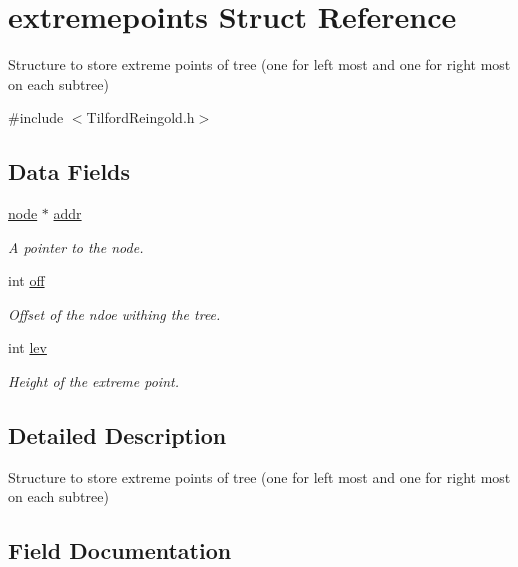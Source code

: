 \hypertarget{structextremepoints}{}\section{extremepoints Struct Reference}
\label{structextremepoints}


Structure to store extreme points of tree (one for left most and one for right most on each subtree)  




{\ttfamily \#include $<$Tilford\+Reingold.\+h$>$}

\subsection*{Data Fields}
\begin{DoxyCompactItemize}
\item 
\hyperlink{binary_tree_w_s_8h_aafd781b4673cf2585cd9a156aebd08de}{node} $\ast$ \hyperlink{structextremepoints_aa6f61de0a8af1deca2a3b63278249175}{addr}
\begin{DoxyCompactList}\small\item\em A pointer to the node. \end{DoxyCompactList}\item 
int \hyperlink{structextremepoints_a9e515b0315e6fc452a46dc6496979ee3}{off}
\begin{DoxyCompactList}\small\item\em Offset of the ndoe withing the tree. \end{DoxyCompactList}\item 
int \hyperlink{structextremepoints_aea7231f581e9da9990ab7ad6fb9a8ce3}{lev}
\begin{DoxyCompactList}\small\item\em Height of the extreme point. \end{DoxyCompactList}\end{DoxyCompactItemize}


\subsection{Detailed Description}
Structure to store extreme points of tree (one for left most and one for right most on each subtree) 

\subsection{Field Documentation}
\hypertarget{structextremepoints_aa6f61de0a8af1deca2a3b63278249175}{}\label{structextremepoints_aa6f61de0a8af1deca2a3b63278249175} 
